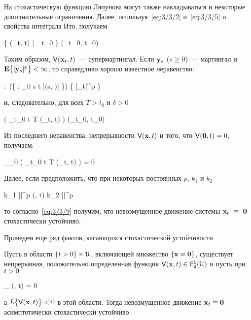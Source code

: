 На стохастическую функцию Ляпунова могут также накладываться и некоторые дополнительные ограничения. Далее, используя~\ref{eq:3/3/2} и~\ref{eq:3/3/5} и свойства интеграла Ито, получаем

	\E \bigl\{ \funcV(_t, t) \bigm| \funcF_{t_0} \bigr\} \leqslant \funcV(_{t_0}, t_0) 
\eeq

Таким образом, $\mathsf{V}(\mathbf{x}_t, t)$~--- супермартингал. Если $\mathbf{y}_s$ ($s \geqslant 0$)~--- мартингал и $\mathbf{E} \bigl\{ |\mathbf{y}_s|^p \bigr\} < \infty$, то справедливо хорошо известное неравенство:

	\forall \alpha:~\prob\Biggl(\bigl\{ \omega \in \Omega : \sup\limits_{0 \leqslant s \leqslant t} |(s, \omega)| \geqslant \alpha \bigr\}\Biggr) \leqslant {} \E \bigl\{ |_t|^p \bigr\}
\eeq

и, следовательно, для всех $T > t_0$ и $\delta > 0$

	\prob\Biggl( \sup\limits_{t_0 \leqslant t \leqslant T} \funcV(_t, t) \geqslant \delta \Biggr) \leqslant {} \funcV(_{t_0}, t_0) 
\eeq

Из последнего неравенства, непрерывности $\mathsf{V}(\mathbf{x}, t)$ и того, что $\mathsf{V}(\mathbf{0}, t) = 0$, получаем:

	\lim\limits_{_0 \to {}} \prob\Biggl( \sup\limits_{t_0 \leqslant t \leqslant T} \funcV(_t, t) \geqslant \delta \Biggr) = 0 
\eeq

Далее, если предположить, что при некоторых постоянных $p$, $k_1$ и $k_2$

	k_1 ||^p \leqslant \funcV(, t) \leqslant k_2 ||^p \text{,}
\eeq

то согласно~\ref{eq:3/3/9} получим, что невозмущенное движение системы $\mathbf{x}_t~\equiv~\mathbf{0}$ стохастически устойчиво.

\br

Приведем еще ряд фактов\cite{HASMINSKI}, касающихся стохастической устойчивости

	Пусть в области $\{ t > 0 \} \times \mathcal{U}$, включающей множество $\{ \mathbf{x} \equiv \mathbf{0} \}$, существует непрерывная, положительно определенная функция $\mathsf{V}(\mathbf{x}, t) \in \mathcal{C}_2^0(\mathcal{U})$ и пусть при $t > 0$
	
		\beqn
			\limsup\limits_{ \to {}} \funcV(, t) = 0 \text{,}
		\eeqn
		
		а $L\bigl\{ \mathsf{V}(\mathbf{x}, t) \bigr\} < 0$ в этой области. Тогда невозмущенное движение $\mathbf{x}_t \equiv \mathbf{0}$ асимптотически стохастически устойчиво.
\eteo

